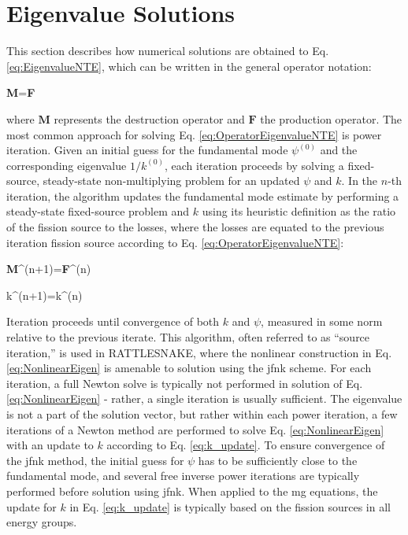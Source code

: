 \section{Eigenvalue Solutions}
\label{sec:EigenvalueCalculations}

This section describes how numerical solutions are obtained to Eq. \eqref{eq:EigenvalueNTE}, which can be written in the general operator notation:

\beq
\label{eq:OperatorEigenvalueNTE}
\textbf{M}\psi=\textbf{F}\psi
\eeq

where \(\textbf{M}\) represents the destruction operator and \(\textbf{F}\) the production operator. The most common approach for solving Eq. \eqref{eq:OperatorEigenvalueNTE} is power iteration. Given an initial guess for the fundamental mode \(\psi^{(0)}\) and the corresponding eigenvalue \(1/k^{(0)}\), each iteration proceeds by solving a fixed-source, steady-state non-multiplying problem for an updated \(\psi\) and \(k\). In the \(n\)-th iteration, the algorithm updates the fundamental mode estimate by performing a steady-state fixed-source problem and \(k\) using its heuristic definition as the ratio of the fission source to the losses, where the losses are equated to the previous iteration fission source according to Eq. \eqref{eq:OperatorEigenvalueNTE}:

\beq
\label{eq:NonlinearEigen}
\textbf{M}\psi^{(n+1)}=\textbf{F}\psi^{(n)}
\eeq

\beq
\label{eq:k_update}
k^{(n+1)}=k^{(n)}
\eeq

Iteration proceeds until convergence of both \(k\) and \(\psi\), measured in some norm relative to the previous iterate. This algorithm, often referred to as ``source iteration,'' is used in RATTLESNAKE, where the nonlinear construction in Eq. \eqref{eq:NonlinearEigen} is amenable to solution using the \gls{jfnk} scheme. For each iteration, a full Newton solve is typically not performed in solution of Eq. \eqref{eq:NonlinearEigen} - rather, a single iteration is usually sufficient. The eigenvalue is not a part of the solution vector, but rather within each power iteration, a few iterations of a Newton method are performed to solve Eq. \eqref{eq:NonlinearEigen} with an update to \(k\) according to Eq. \eqref{eq:k_update}. To ensure convergence of the \gls{jfnk} method, the initial guess for \(\psi\) has to be sufficiently close to the fundamental mode, and several free inverse power iterations are typically performed before solution using \gls{jfnk}. When applied to the \gls{mg} equations, the update for \(k\) in Eq. \eqref{eq:k_update} is typically based on the fission sources in all energy groups.

